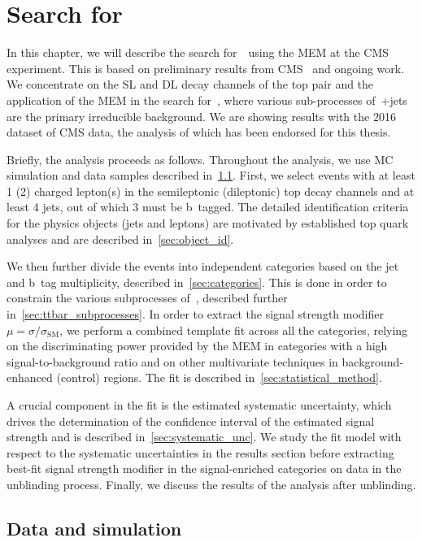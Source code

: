 \chapter{Search for \ttHbb}

In this chapter, we will describe the search for~\ttHbb~using the MEM at the CMS experiment. This is based on preliminary results from CMS~\cite{CMS:2016qwm,CMS:2016zbb} and ongoing work. We concentrate on the SL and DL decay channels of the top pair and the application of the MEM in the search for~\ttHbb, where various sub-processes of~\ttbar+jets are the primary irreducible background. We are showing results with the 2016 dataset of CMS data, the analysis of which has been endorsed for this thesis.

Briefly, the analysis proceeds as follows. Throughout the analysis, we use MC simulation and data samples described in~\cref{sec:data_mc}. First, we select events with at least 1 (2) charged lepton(s) in the semileptonic (dileptonic) top decay channels and at least 4 jets, out of which 3 must be b~tagged. The detailed identification criteria for the physics objects (jets and leptons) are motivated by established top quark analyses and are described in~\cref{sec:object_id}.

We then further divide the events into independent categories based on the jet and b~tag multiplicity, described in~\cref{sec:categories}. This is done in order to constrain the various subprocesses of~\ttbar, described further in~\cref{sec:ttbar_subprocesses}. In order to extract the signal strength modifier~$\mu = \sigma/\sigma_{\mathrm{SM}}$, we perform a combined template fit across all the categories, relying on the discriminating power provided by the MEM in categories with a high signal-to-background ratio and on other multivariate techniques in background-enhanced (control) regions. The fit is described in~\cref{sec:statistical_method}.

A crucial component in the fit is the estimated systematic uncertainty, which drives the determination of the confidence interval of the estimated signal strength and is described in~\cref{sec:systematic_unc}. We study the fit model with respect to the systematic uncertainties in the results section before extracting best-fit signal strength modifier in the signal-enriched categories on data in the unblinding process. Finally, we discuss the results of the analysis after unblinding.

\section{Data and simulation}
\label{sec:data_mc}

